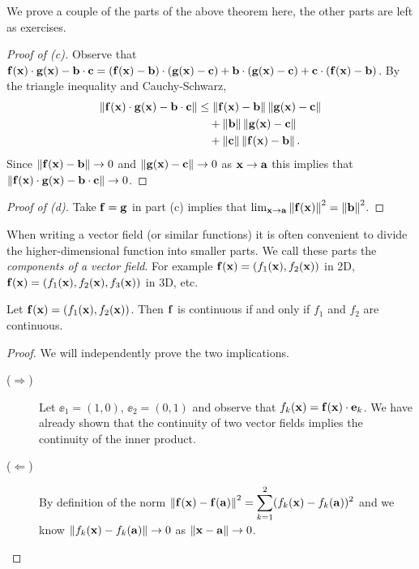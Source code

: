 We prove a couple of the parts of the above theorem here, the other parts are left as exercises.

\begin{proof}[Proof of (c)]
    Observe that  \(
    \mathbf{f}(\mathbf{x})\cdot\mathbf{g}(\mathbf{x}) - \mathbf{b}\cdot \mathbf{c}
    = (\mathbf{f}(\mathbf{x})-\mathbf{b})\cdot(\mathbf{g}(\mathbf{x})-\mathbf{c}) + \mathbf{b}\cdot(\mathbf{g}(\mathbf{x})-\mathbf{c}) + \mathbf{c}\cdot(\mathbf{f}(\mathbf{x})-\mathbf{b})
    \).
    By the triangle inequality and Cauchy-Schwarz,
    \[
        \begin{aligned}
            \left\|\mathbf{f}(\mathbf{x})\cdot\mathbf{g}(\mathbf{x}) - \mathbf{b}\cdot \mathbf{c} \right\|
             & \leq \left\|\mathbf{f}(\mathbf{x})-\mathbf{b}\right\| \left\|\mathbf{g}(\mathbf{x})-\mathbf{c}\right\| \\
             & \quad + \left\|\mathbf{b}\right\|\left\|\mathbf{g}(\mathbf{x})-\mathbf{c}\right\|        \\
             & \quad + \left\|\mathbf{c}\right\| \left\|\mathbf{f}(\mathbf{x})-\mathbf{b}\right\|.
        \end{aligned}
    \]
    Since \(\left\|\mathbf{f}(\mathbf{x})-\mathbf{b}\right\| \to 0\) and \(\left\|\mathbf{g}(\mathbf{x})-\mathbf{c}\right\| \to 0\) as \(\mathbf{x} \to \mathbf{a}\) this implies that \(\left\|\mathbf{f}(\mathbf{x})\cdot\mathbf{g}(\mathbf{x}) - \mathbf{b}\cdot \mathbf{c} \right\|\to 0\).
\end{proof}

\begin{proof}[Proof of (d)]
    Take \(\mathbf{f} = \mathbf{g}\) in part (c) implies that \(   \lim_{\mathbf{x} \to \mathbf{a}} \left\|\mathbf{f}(\mathbf{x})\right\|^2 = \left\|\mathbf{b}\right\|^2\).
\end{proof}


When writing a vector field (or similar functions) it is often convenient to divide the higher-dimensional function into smaller parts.
We call these parts the \emph{components of a vector field}.
For example \(\mathbf{f}(\mathbf{x}) = \left(f_1(\mathbf{x}),f_2(\mathbf{x})\right)\) in 2D, \(\mathbf{f}(\mathbf{x}) = \left(f_1(\mathbf{x}),f_2(\mathbf{x}),f_3(\mathbf{x})\right)\) in 3D, etc.

\begin{theorem}
    Let \(\mathbf{f}(\mathbf{x}) = \left(f_1(\mathbf{x}),f_2(\mathbf{x})\right)\).
    Then \(\mathbf{f}\) is continuous if and only if \(f_1\) and \(f_2\) are continuous.
\end{theorem}
\begin{proof}
    We will independently prove the two implications.
    \begin{description}
        \item[(\(\Rightarrow\))]
            Let
            \( \ee_1=(1,0) \), \( \ee_2=(0,1) \)
            and observe that \(f_k(\mathbf{x}) = \mathbf{f}(\mathbf{x})\cdot \mathbf{e}_k\).
            We have already shown that the continuity of two vector fields implies the continuity of the inner product.
        \item[(\(\Leftarrow \))]
            By definition of the norm
            \(\left\|\mathbf{f}(\mathbf{x})-\mathbf{f}(\mathbf{a})\right\|^2 = \displaystyle\sum_{k=1}^{2}(f_k(\mathbf{x})-f_k(\mathbf{a}))^2\)
            and we know \(\left\|f_k(\mathbf{x})-f_k(\mathbf{a})\right\| \to 0\) as \(\left\|\mathbf{x}-\mathbf{a}\right\|\to 0\). \qedhere
    \end{description}
\end{proof}

